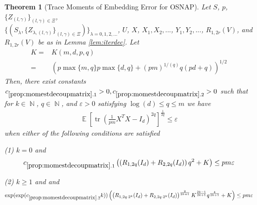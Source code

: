 \documentclass[11pt]{amsart}
\numberwithin{equation}{section}
\numberwithin{equation}{section}
\DeclareMathOperator{\E}{\mathbb{E}}
\DeclareMathOperator{\N}{\mathbb{N}}
\DeclareMathOperator*{\tr}{tr}
\newtheorem{theorem}{Theorem}[section]
\begin{document}
\begin{theorem}[Trace Moments of Embedding Error for OSNAP] \label{prop:momestdecoupmatrix}
Let $S$, $p$, $\{Z_{(l,\gamma)}\}_{(l,\gamma) \in \Xi}$,\\ $\{(S_{\lambda},\{Z_{\lambda,(l,\gamma)}\}_{(l,\gamma) \in \Xi})\}_{\lambda=0,1,2,...}$, $U$, $X$, $X_1,X_2,...$, $Y_1,Y_2,...$, $R_{1,2r}(V)$, and $R_{1,2r}(V)$ be as in Lemma \ref{lem:iterdec}.
Let
\begin{align*}
    K=&K(m,d,p,q)\\=&\left(p\max\{m,q\}p\max\{d,q\}+(pm)^{1/(q)}q(pd+q) \right)^{1/2}
\end{align*}
Then, there exist constants $c_{\ref{prop:momestdecoupmatrix}.1}> 0, c_{\ref{prop:momestdecoupmatrix}.2}>0$ such that for $k \in \N$, $q \in \N$, and $\varepsilon>0$ satisfying $\log (d) \le q \le m$ we have
\begin{align*}
    \E[\tr(\frac{1}{pm}X^TX - I_d)^{2q}]^\frac{1}{2q} \leq  \varepsilon
\end{align*}
when either of the following conditions are satisfied

(1) $k=0$ and
\begin{align*}
c_{\ref{prop:momestdecoupmatrix}.1}\left(\left(R_{1,2q }(I_d)+R_{2,2q }(I_d)\right)q^{2}+K\right) \le pm \varepsilon
\end{align*} 

(2) $k \ge 1$ and 
and \begin{align*}
\exp(\exp(c_{\ref{prop:momestdecoupmatrix}.2}k))\left(\left(R_{1,2q \cdot 2^k}(I_d)+R_{2,2q \cdot 2^k}(I_d)\right)^{\frac{2}{2k+1}}K^{\frac{2k-1}{2k+1}} q^{\frac{4}{2k+1}}+K\right) \le pm \varepsilon
\end{align*} 

\end{theorem}
\end{document}
